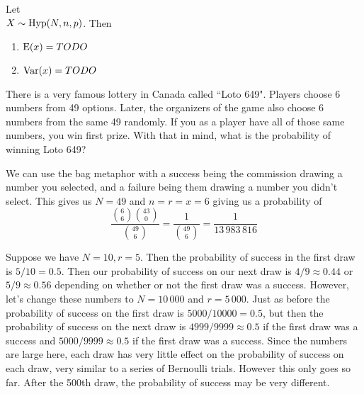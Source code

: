 \documentclass{report}
\begin{document}
\begin{theorem}
    Let \\ $X \sim \textup{Hyp}(N,n,p)$. Then
    \begin{enumerate}
        \item $\textup{E}(x)=TODO\quad$
        \item $\textup{Var}(x)=TODO\quad$
    \end{enumerate}
\end{theorem}

\begin{example}[Loto 649]
    There is a very famous lottery in Canada called ``Loto 649". Players choose 6 numbers from 49 options. Later, the organizers of the game also choose 6 numbers from the same 49 randomly. If you as a player have all of those same numbers, you win first prize. With that in mind, what is the probability of winning Loto 649?

    We can use the bag metaphor with a success being the commission drawing a number you selected, and a failure being them drawing a number you didn't select. This gives us $N=49$ and $n=r=x=6$ giving us a probability of
    \[
        \displaystyle\frac{\binom 6 6 \binom {43}{0}}{\binom {49}{6}}=\frac 1{\binom {49} 6}=\frac 1 {13\,983\,816}
    \]
\end{example}
Suppose we have $N=10, r=5$. Then the probability of success in the first draw is $5/10=0.5$. Then our probability of success on our next draw is $4/9\approx 0.44$ or $5/9\approx 0.56$ depending on whether or not the first draw was a success. However, let's change these numbers to $N=10\,000$ and $r=5\,000$. Just as before the probability of success on the first draw is $5000/10000=0.5$, but then the probability of success on the next draw is $4999/9999\approx 0.5$ if the first draw was a success and $5000/9999\approx 0.5$ if the first draw was a success. Since the numbers are large here, each draw has very little effect on the probability of success on each draw, very similar to a series of Bernoulli trials. However this only goes so far. After the 500th draw, the probability of success may be very different. 
\end{document}
